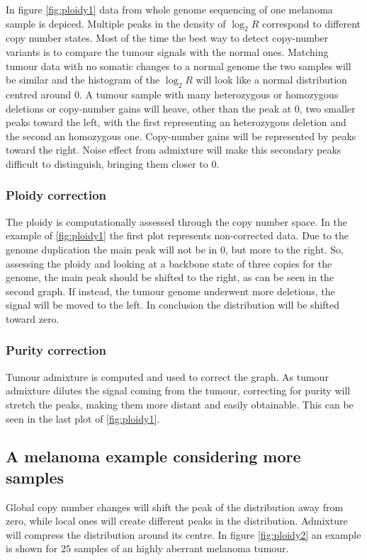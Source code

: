   In figure \ref{fig:ploidy1} data from whole genome sequencing of one melanoma sample is depiced.
  Multiple peaks in the density of $\log_2 R$ correspond to different copy number states.
  Most of the time the best way to detect copy-number variants is to compare the tumour signals with the normal ones.
  Matching tumour data with no somatic changes to a normal genome the two samples will be similar and the histogram of the $\log_2 R$ will look like a normal distribution centred around $0$.
  A tumour sample with many heterozygous or homozygous deletions or copy-number gains will heave, other than the peak at $0$, two smaller peaks toward the left, with the first representing an heterozygous deletion and the second an homozygous one.
  Copy-number gains will be represented by peaks toward the right.
  Noise effect from admixture will make this secondary peaks difficult to distinguish, bringing them closer to $0$.

    \subsubsection{Ploidy correction}
    The ploidy is computationally assessed through the copy number space.
    In the example of \ref{fig:ploidy1} the first plot represents non-corrected data.
    Due to the genome duplication the main peak will not be in $0$, but more to the right.
    So, assessing the ploidy and looking at a backbone state of three copies for the genome, the main peak should be shifted to the right, as can be seen in the second graph.
    If instead, the tumour genome underwent more deletions, the signal will be moved to the left.
    In conclusion the distribution will be shifted toward zero.

    \subsubsection{Purity correction}
    Tumour admixture is computed and used to correct the graph.
    As tumour admixture dilutes the signal coming from the tumour, correcting for purity will stretch the peaks, making them more distant and easily obtainable.
    This can be seen in the last plot of \ref{fig:ploidy1}.

  \subsection{A melanoma example considering more samples}
  Global copy number changes will shift the peak of the distribution away from zero, while local ones will create different peaks in the distribution.
  Admixture will compress the distribution around its centre.
  In figure \ref{fig:ploidy2} an example is shown for $25$ samples of an highly aberrant melanoma tumour.


